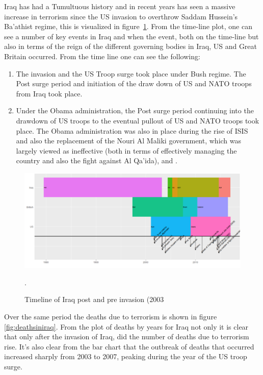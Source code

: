 Iraq has had a Tumultuous history and in recent years has seen a massive increase in terrorism since the US invasion to overthrow Saddam Hussein's Ba'athist regime, this is visualized in figure~\ref{fig:timelineiraq}. From the time-line plot, one can see a number of key events in Iraq and when the event, both on the time-line but also in terms of the reign of the different governing bodies in Iraq, US and Great Britain occurred. From the time line one can see the following:
\begin{enumerate}
\item The invasion and the US Troop surge took place under Bush regime. The Post surge period and initiation of the draw down of US and NATO troops from Iraq took place.  
\item  Under the Obama administration, the Post surge period continuing into the drawdown of US troops to the eventual pullout of US and NATO troops took place. The Obama administration was also in place during the rise of ISIS and also the replacement of the Nouri Al Maliki government, which was largely viewed as ineffective (both in terms of effectively managing the country and also the fight against Al Qa'ida), \citep{simon2008price} and \citep{kuoti2016exclusion}.
\end{enumerate}

\begin{figure}[t]
\includegraphics[width=15cm]{Peters_experiment_markdown_files/figure-latex/CaptureTimelineIraq.png}
\caption{Timeline of Iraq post and pre invasion (2003}.
\label{fig:timelineiraq}
\centering
\end{figure}

Over the same period the deaths due to terrorism is shown in figure~ \ref{fig:deathsiniraq}. From the plot of deaths by years for Iraq not only it is clear that only after the invasion of Iraq, did the number of deaths due to terrorism rise. It's also clear from the bar chart that the outbreak of deaths that occurred increased sharply from 2003 to 2007, peaking during the year of the US troop surge.  

